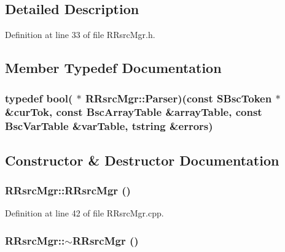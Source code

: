 \subsection{Detailed Description}


Definition at line 33 of file RRsrcMgr.h.

\subsection{Member Typedef Documentation}
\hypertarget{class_r_rsrc_mgr_359896706d65e8e2e2ced96dc0d49e56}{
\subsubsection[{Parser}]{\setlength{\rightskip}{0pt plus 5cm}typedef bool( $\ast$ {\bf RRsrcMgr::Parser})(const {\bf SBscToken} $\ast$\&curTok, const {\bf BscArrayTable} \&arrayTable, const {\bf BscVarTable} \&varTable, {\bf tstring} \&errors)}}
\label{class_r_rsrc_mgr_359896706d65e8e2e2ced96dc0d49e56}




\subsection{Constructor \& Destructor Documentation}
\hypertarget{class_r_rsrc_mgr_acd157e562874bb99560a186389a7462}{
\subsubsection[{RRsrcMgr}]{\setlength{\rightskip}{0pt plus 5cm}RRsrcMgr::RRsrcMgr ()}}
\label{class_r_rsrc_mgr_acd157e562874bb99560a186389a7462}




Definition at line 42 of file RRsrcMgr.cpp.\hypertarget{class_r_rsrc_mgr_2c82af2b8c9a9aebd2ac10867e37df60}{
\subsubsection[{$\sim$RRsrcMgr}]{\setlength{\rightskip}{0pt plus 5cm}RRsrcMgr::$\sim$RRsrcMgr ()}}
\label{class_r_rsrc_mgr_2c82af2b8c9a9aebd2ac10867e37df60}




